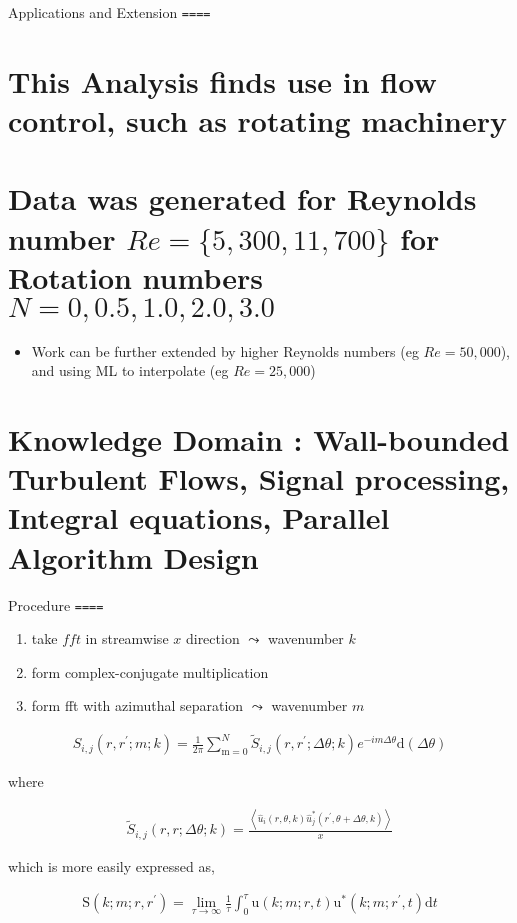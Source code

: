 \documentclass[11pt]{article}
\begin{document}
Applications and Extension
\texttt{====}
\section{This Analysis finds use in flow control, such as rotating machinery}
\label{sec:org607b3f8}
\section{Data was generated for Reynolds number \(Re = \{5,300 , 11,700 \}\) for Rotation numbers \(N = 0, 0.5, 1.0 , 2.0 , 3.0\)}
\label{sec:org6801b0d}
\begin{itemize}
\item Work can be further extended by higher Reynolds numbers (eg \(Re=50,000\)), and using ML to interpolate (eg \(Re=25,000\))
\end{itemize}
\section{Knowledge Domain :  Wall-bounded Turbulent Flows, Signal processing, Integral equations, Parallel Algorithm Design}
\label{sec:org5462b19}

Procedure
\texttt{====}


\begin{enumerate}
\item take \(f f t\) in streamwise \(x\) direction \(\leadsto\) wavenumber \(k\)
\item form complex-conjugate multiplication
\item form fft with azimuthal separation \(\leadsto\) wavenumber \(m\)
\end{enumerate}

\begin{align}
S_{i, j}\left(r, r^{\prime} ; m ; k\right)=\frac{1}{2 \pi} \sum_{\mathrm{m}=0}^N \tilde{S}_{i, j}\left(r, r^{\prime}; \Delta \theta ; k\right) e^{-i m \Delta \theta} \mathrm{d}(\Delta \theta) 
\end{align} 

where

\begin{align}
\tilde{S}_{i, j}(r, r ; \Delta \theta ; k)=\frac{\left\langle\hat{u}_i(r, \theta, k) \hat{u}_j^*\left(r^{\prime}, \theta+\Delta \theta, k\right)\right\rangle}{x}
\end{align} 

which is more easily expressed as,

\begin{align}
\mathrm{S}\left(k ; m ; r, r^{\prime}\right)=\lim _{\tau \rightarrow \infty} \frac{1}{\tau} \int_0^\tau \mathrm{u}(k ; m ; r, t) \mathrm{u}^*\left(k ; m ; r^{\prime}, t\right) \mathrm{d} t
\end{align} 
\end{document}
